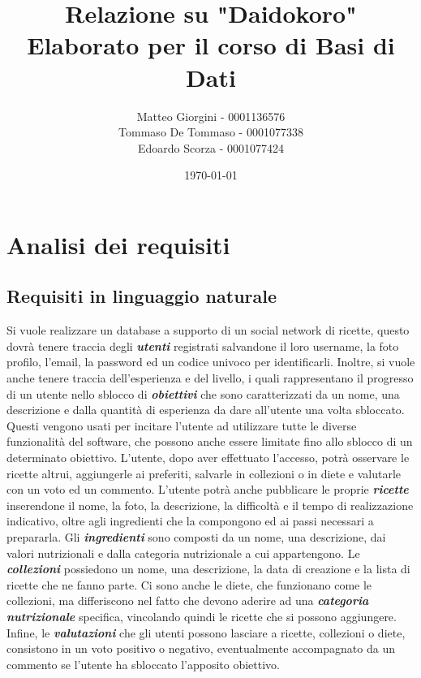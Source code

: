 ﻿\documentclass[a4paper,12pt]{report}
\title{Relazione su "Daidokoro" \\ Elaborato per il corso di Basi di Dati}
\author
{
    Matteo Giorgini - 0001136576 \\
    Tommaso De Tommaso - 0001077338 \\
    Edoardo Scorza - 0001077424 \\
}
\date{\today}
\begin{document}
\maketitle
\tableofcontents
\chapter{Analisi dei requisiti}
\section{Requisiti in linguaggio naturale}
Si vuole realizzare un database a supporto di un social network di ricette, questo dovrà tenere traccia degli \textbf{\textit{utenti}} registrati salvandone il loro username, la foto profilo, l'email, la password ed un codice univoco per identificarli.
Inoltre, si vuole anche tenere traccia dell'esperienza e del livello, i quali rappresentano il progresso di un utente nello sblocco di \textbf{\textit{obiettivi}} che sono caratterizzati da un nome, una descrizione e dalla quantità di esperienza da dare all'utente una volta sbloccato.
Questi vengono usati per incitare l'utente ad utilizzare tutte le diverse funzionalità del software, che possono anche essere limitate fino allo sblocco di un determinato obiettivo.
L'utente, dopo aver effettuato l'accesso, potrà osservare le ricette altrui, aggiungerle ai preferiti, salvarle in collezioni o in diete e valutarle con un voto ed un commento.
L'utente potrà anche pubblicare le proprie \textbf{\textit{ricette}} inserendone il nome, la foto, la descrizione, la difficoltà e il tempo di realizzazione indicativo, oltre agli ingredienti che la compongono ed ai passi necessari a prepararla.
Gli \textbf{\textit{ingredienti}} sono composti da un nome, una descrizione, dai valori nutrizionali e dalla categoria nutrizionale a cui appartengono.
Le \textbf{\textit{collezioni}} possiedono un nome, una descrizione, la data di creazione e la lista di ricette che ne fanno parte.
Ci sono anche le diete, che funzionano come le collezioni, ma differiscono nel fatto che devono aderire ad una \textbf{\textit{categoria nutrizionale}} specifica, vincolando quindi le ricette che si possono aggiungere.
Infine, le \textbf{\textit{valutazioni}} che gli utenti possono lasciare a ricette, collezioni o diete, consistono in un voto positivo o negativo, eventualmente accompagnato da un commento se l'utente ha sbloccato l'apposito obiettivo.
\\
\end{document}

